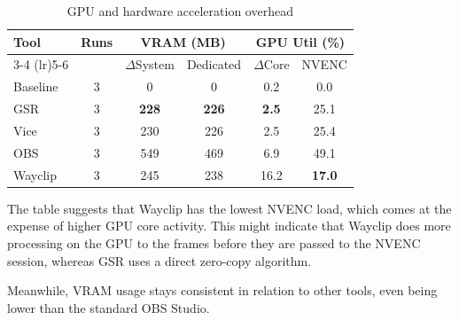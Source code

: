 \begin{table}[ht]
	\centering
	\small
	\caption{GPU and hardware acceleration overhead}
	\label{tab:gpu}
	\begin{tabular}{l c cc cc}
		\toprule
		{\textbf{Tool}} & {\textbf{Runs}} & \multicolumn{2}{c}{\textbf{VRAM (MB)}} & \multicolumn{2}{c}{\textbf{GPU Util (\%)}}                                 \\
		\cmidrule(lr){3-4} \cmidrule(lr){5-6}
		                &                 & $\Delta$System                         & Dedicated                                  & $\Delta$Core & NVENC          \\
		\midrule
		Baseline        & 3               & \phantom{00}0                          & \phantom{00}0                              & 0.2          & \phantom{0}0.0 \\
		\midrule
		GSR             & 3               & \textbf{228}                           & \textbf{226}                               & \textbf{2.5} & 25.1           \\
		Vice            & 3               & 230                                    & 226                                        & 2.5          & 25.4           \\
		OBS             & 3               & 549                                    & 469                                        & 6.9          & 49.1           \\
		Wayclip         & 3               & 245                                    & 238                                        & 16.2         & \textbf{17.0}  \\
		\bottomrule
	\end{tabular}
\end{table}

The table suggests that Wayclip has the lowest NVENC load, which comes at the expense of higher GPU core activity.
This might indicate that Wayclip does more processing on the GPU to the frames before they are passed to the NVENC session, whereas GSR uses a direct zero-copy algorithm.

Meanwhile, VRAM usage stays consistent in relation to other tools, even being lower than the standard OBS Studio.
